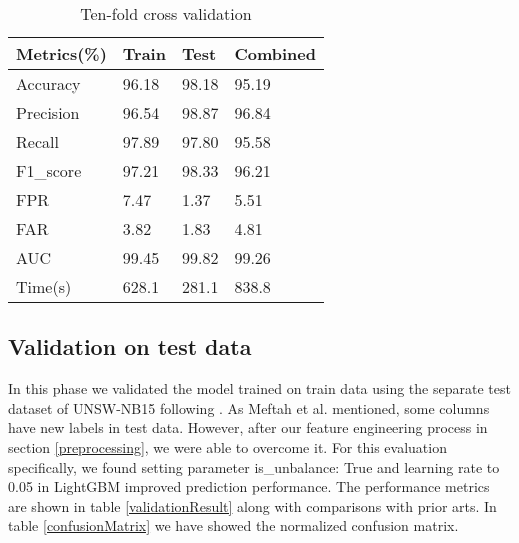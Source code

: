 \documentclass[14pt, conference]{IEEEtran}
\begin{document}
\begin{table}
\normalsize
\centering
\caption{Ten-fold cross validation}
\label{tenFoldCrossValidation}
\renewcommand{\arraystretch}{1.2}
\begin{tabular}{|C{2.3cm}|C{1.3cm}|C{1.3cm}|C{1.8cm}|}
\hline
\textbf{Metrics(\%)} & \textbf{Train} & \textbf{Test} & \textbf{Combined}\\ \hline
Accuracy & 96.18 & 98.18 & 95.19 \\ \hline
Precision & 96.54 & 98.87& 96.84\\ \hline
Recall  & 97.89 & 97.80 & 95.58\\ \hline
F1\_score  & 97.21 & 98.33 & 96.21\\ \hline
FPR & 7.47 & 1.37 & 5.51\\ \hline
FAR & 3.82 & 1.83 & 4.81 \\ \hline
AUC & 99.45 & 99.82 & 99.26\\ \hline
Time(s) & 628.1 & 281.1 & 838.8\\ \hline
\end{tabular}
\end{table}


\subsection{Validation on test data}
In this phase we validated the model trained on train data using the separate test dataset of UNSW-NB15 following
\cite{bhamare2016feasibility} \cite{vinayakumar2019deep} \cite{dahiya2018network}. As  Meftah et al. \cite{meftah2019network}
mentioned, some columns have new labels in test data. However, after our feature engineering process in section
\ref{preprocessing}, we were able to overcome it. For this evaluation specifically, we found setting parameter
is\_unbalance: True and learning rate to 0.05 in LightGBM improved prediction performance. The performance metrics
are shown in table \ref{validationResult} along with comparisons with prior arts. In table \ref{confusionMatrix}
we have showed the normalized confusion matrix.
\end{document}
